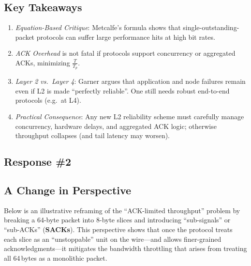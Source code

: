\documentclass[../../../OAE-SPEC-MAIN.tex]{subfiles}
\begin{document}

\subsection{Key Takeaways}

\begin{enumerate}
\item \emph{Equation-Based Critique}: Metcalfe’s formula shows that single-outstanding-packet protocols can suffer large performance hits at high bit rates.
\item \emph{ACK Overhead} is not fatal if protocols support concurrency or aggregated ACKs, minimizing $\tfrac{T}{T_p}$.
\item \emph{Layer 2 vs.\ Layer 4}: Garner argues that application and node failures remain even if L2 is made ``perfectly reliable''. One still needs robust end-to-end protocols (e.g.\ at L4).
\item \emph{Practical Consequence}: Any new L2 reliability scheme must carefully manage concurrency, hardware delays, and aggregated ACK logic; otherwise throughput collapses (and tail latency may worsen).
\end{enumerate}




\subsection{Response \#2}


\subsection*{A Change in Perspective}

Below is an illustrative reframing of the ``ACK-limited throughput'' problem by breaking a 64-byte packet into 8-byte slices and introducing ``sub-signals'' or ``sub-ACKs'' (\textbf{SACKs}). This perspective shows that once the protocol treats each slice as an ``unstoppable'' unit on the wire---and allows finer-grained acknowledgments---it mitigates the bandwidth throttling that arises from treating all 64\,bytes as a monolithic packet.
\end{document}

